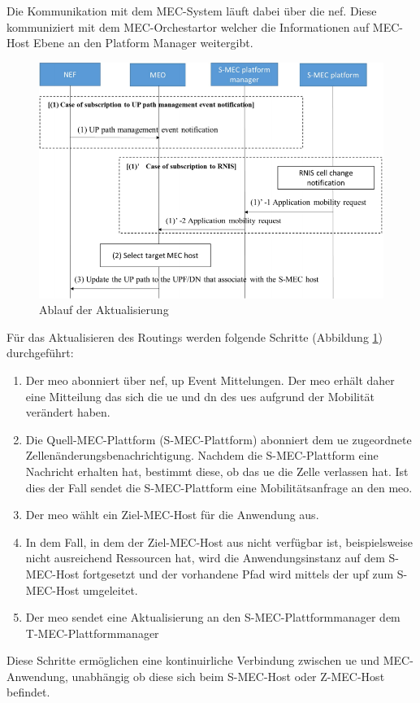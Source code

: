 \documentclass[runningheads]{llncs}
\numberwithin{figure}{section}
\begin{document}
Die Kommunikation mit dem MEC-System läuft dabei über die \acrshort{nef}. Diese kommuniziert mit dem MEC-Orchestartor welcher
die Informationen auf MEC-Host Ebene an den Platform Manager weitergibt.
\begin{figure}
  \includegraphics[width=\linewidth]{images/Datenverkehr_Ablauf.png}
  \caption{Ablauf der Aktualisierung}
  \label{fig:Datenverkehr_Ablauf}
\end{figure}
Für das Aktualisieren des Routings werden folgende Schritte (Abbildung \ref{fig:Datenverkehr_Ablauf}) durchgeführt:
\begin{enumerate}
  \item Der \acrfull{meo} abonniert über \acrshort{nef}, \acrshort{up} Event Mittelungen. 
  Der \acrshort{meo} erhält daher eine Mitteilung das sich die \acrshort{ue} und \acrshort{dn} des
  \acrshort{ue}s aufgrund der Mobilität verändert haben.
  \item Die Quell-MEC-Plattform (S-MEC-Plattform) abonniert dem \acrshort{ue} zugeordnete Zellenänderungsbenachrichtigung. 
  Nachdem die S-MEC-Plattform eine Nachricht erhalten hat, bestimmt diese, ob das \acrshort{ue} die Zelle verlassen hat. 
  Ist dies der Fall sendet die S-MEC-Plattform eine Mobilitätsanfrage an den \acrshort{meo}.
  \item Der \acrshort{meo} wählt ein Ziel-MEC-Host für die Anwendung aus.
  \item In dem Fall, in dem der Ziel-MEC-Host aus nicht verfügbar ist, beispielsweise nicht ausreichend Ressourcen hat,
  wird die Anwendungsinstanz auf dem S-MEC-Host fortgesetzt und der vorhandene Pfad wird mittels der \acrshort{upf} zum S-MEC-Host umgeleitet.
  \item Der \acrshort{meo} sendet eine Aktualisierung an den S-MEC-Plattformmanager dem T-MEC-Plattformmanager
\end{enumerate}
Diese Schritte ermöglichen eine kontinuirliche Verbindung zwischen \acrshort{ue} und MEC-Anwendung, unabhängig ob diese sich beim S-MEC-Host oder Z-MEC-Host befindet.
\end{document}
